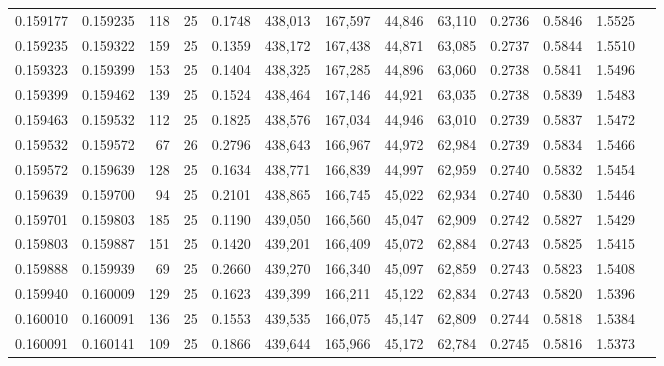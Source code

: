 \begin{tabular}{rrrrrrrrrrrrr}
0.159177 & 0.159235 &   118 &  25 &                                     0.1748 & 438,013 & 167,597 &  44,846 &  63,110 & 0.2736 & 0.5846 & 1.5525 \\
0.159235 & 0.159322 &   159 &  25 &                                     0.1359 & 438,172 & 167,438 &  44,871 &  63,085 & 0.2737 & 0.5844 & 1.5510 \\
0.159323 & 0.159399 &   153 &  25 &                                     0.1404 & 438,325 & 167,285 &  44,896 &  63,060 & 0.2738 & 0.5841 & 1.5496 \\
0.159399 & 0.159462 &   139 &  25 &                                     0.1524 & 438,464 & 167,146 &  44,921 &  63,035 & 0.2738 & 0.5839 & 1.5483 \\
0.159463 & 0.159532 &   112 &  25 &                                     0.1825 & 438,576 & 167,034 &  44,946 &  63,010 & 0.2739 & 0.5837 & 1.5472 \\
0.159532 & 0.159572 &    67 &  26 &                                     0.2796 & 438,643 & 166,967 &  44,972 &  62,984 & 0.2739 & 0.5834 & 1.5466 \\
0.159572 & 0.159639 &   128 &  25 &                                     0.1634 & 438,771 & 166,839 &  44,997 &  62,959 & 0.2740 & 0.5832 & 1.5454 \\
0.159639 & 0.159700 &    94 &  25 &                                     0.2101 & 438,865 & 166,745 &  45,022 &  62,934 & 0.2740 & 0.5830 & 1.5446 \\
0.159701 & 0.159803 &   185 &  25 &                                     0.1190 & 439,050 & 166,560 &  45,047 &  62,909 & 0.2742 & 0.5827 & 1.5429 \\
0.159803 & 0.159887 &   151 &  25 &                                     0.1420 & 439,201 & 166,409 &  45,072 &  62,884 & 0.2743 & 0.5825 & 1.5415 \\
0.159888 & 0.159939 &    69 &  25 &                                     0.2660 & 439,270 & 166,340 &  45,097 &  62,859 & 0.2743 & 0.5823 & 1.5408 \\
0.159940 & 0.160009 &   129 &  25 &                                     0.1623 & 439,399 & 166,211 &  45,122 &  62,834 & 0.2743 & 0.5820 & 1.5396 \\
0.160010 & 0.160091 &   136 &  25 &                                     0.1553 & 439,535 & 166,075 &  45,147 &  62,809 & 0.2744 & 0.5818 & 1.5384 \\
0.160091 & 0.160141 &   109 &  25 &                                     0.1866 & 439,644 & 165,966 &  45,172 &  62,784 & 0.2745 & 0.5816 & 1.5373 \\

\end{tabular}
